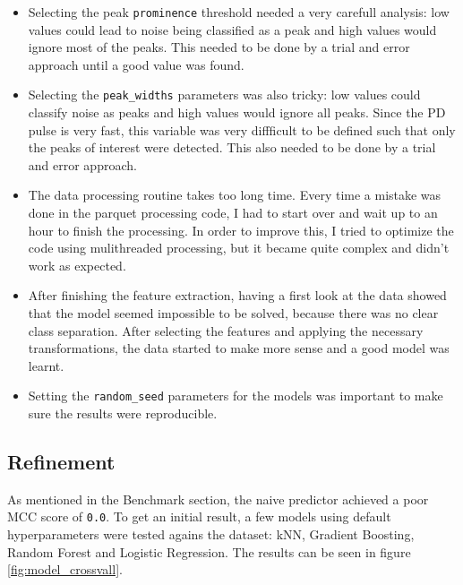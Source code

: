 \documentclass[11pt]{article}
\begin{document}
\begin{itemize}
	\item
	Selecting the peak \texttt{prominence} threshold needed a very carefull analysis: low values could lead to noise being classified as a peak and high values would ignore most of the peaks. This needed to be done by a trial and error approach until a good value was found.
	
	\item 
	Selecting the \texttt{peak\_widths} parameters was also tricky: low values could classify noise as peaks and high values would ignore all peaks. Since the PD pulse is very fast, this variable was very diffficult to be defined such that only the peaks of interest were detected. This also needed to be done by a trial and error approach.
	
	\item 
	The data processing routine takes too long time. Every time a mistake was done in the parquet processing code, I had to start over and wait up to an hour to finish the processing. In order to improve this, I tried to optimize the code using mulithreaded processing, but it became quite complex and didn't work as expected.
	
	\item 
	After finishing the feature extraction, having a first look at the data showed that the model seemed impossible to be solved, because there was no clear class separation. After selecting the features and applying the necessary transformations, the data started to make more sense and a good model was learnt.
	
	\item 
	Setting the \texttt{random\_seed} parameters for the models was important to make sure the results were reproducible.
	
\end{itemize}



\hypertarget{refinement}{%
\subsection{Refinement}\label{refinement}}

As mentioned in the Benchmark section, the naive predictor achieved a
poor MCC score of \texttt{0.0}. To get an initial result, a few models
using default hyperparameters were tested agains the dataset: kNN,
Gradient Boosting, Random Forest and Logistic Regression. The results
can be seen in figure \ref{fig:model_crossvall}.
\end{document}
